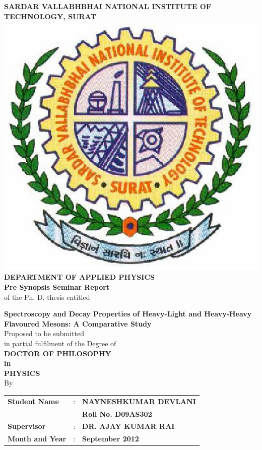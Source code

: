 \documentclass[draft,11pt]{scrreprt}
\begin{document}
\pagestyle{empty}
\begin{center}
\large\textbf{{SARDAR VALLABHBHAI NATIONAL INSTITUTE OF TECHNOLOGY, SURAT}}\\
\vfill
\includegraphics[scale=0.25]{svnit}\\ \vfill
\textbf{DEPARTMENT OF APPLIED PHYSICS}\\ \vfill
\textbf{Pre Synopsis Seminar Report}\\  \vfill
\normalsize
of the Ph. D. thesis entitled\\ \vfill

\large
\textbf{Spectroscopy and Decay Properties of Heavy-Light and Heavy-Heavy Flavoured Mesons: A Comparative Study}\\
\vfill
\normalsize
Proposed to be submitted\\
in partial fulfilment of the Degree of\\
\vfill
\textbf{DOCTOR OF PHILOSOPHY\\ in \\ PHYSICS}\\
\vfill By\\

\begin{tabular}{lcl}
\textbf{Student Name} & : & {\textbf{NAYNESHKUMAR DEVLANI}} \\
& & \textbf{Roll No. D09AS302} \\
\textbf{Supervisor} & : & \textbf{DR. AJAY KUMAR RAI}\\
\textbf{Month and Year} & : & \textbf{September 2012}



\end{tabular}
\end{center}
\end{document}
